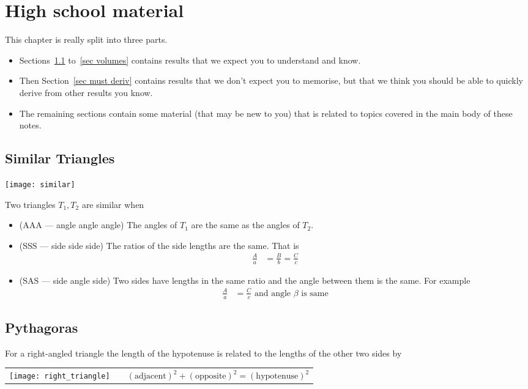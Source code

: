 %
%
\graphicspath{{figures/highschool/}}
\chapter{High school material}\label{app highschool}
This chapter is really split into three parts.
\begin{itemize}
 \item Sections~\ref{sec simtri} to~\ref{sec volumes} contains results
that we expect you to understand and know.
\item Then Section~\ref{sec must deriv} contains results that we don't
expect you to memorise, but that we think you should be able to
quickly derive from other results you know.
\item The remaining sections contain some material (that may be new to you)
that is related to topics covered in the main body of these notes.
\end{itemize}

\section{Similar Triangles}\label{sec simtri}
\begin{center}
 \texttt{[image: similar]}
\end{center}
Two triangles $T_1,T_2$ are similar when
\begin{itemize}
 \item (AAA --- angle angle angle) The angles of $T_1$ are the same as the
angles of $T_2$.
 \item (SSS --- side side side) The ratios of the side lengths are the same.
That is
\begin{align*}
  \frac{A}{a} &= \frac{B}{b} = \frac{C}{c}
\end{align*}
 \item (SAS --- side angle side) Two sides have lengths in the same ratio and
the angle between them is the same. For example
\begin{align*}
  \frac{A}{a} &= \frac{C}{c} \text{ and angle $\beta$ is same}
\end{align*}
\end{itemize}


\section{Pythagoras}
For a right-angled triangle the length of the hypotenuse is related to the lengths of the other two sides by
\begin{center}
\begin{tabular}{m{4cm}cm{9cm}}
  \texttt{[image: right\_triangle]} &\qquad &
$(\text{adjacent})^2+(\text{opposite})^2 = (\text{hypotenuse})^2$
\end{tabular}
\end{center}
